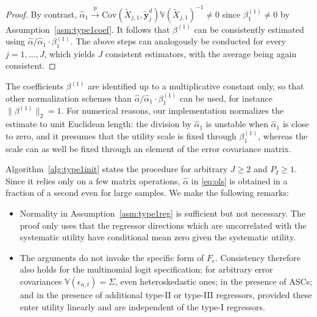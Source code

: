 \documentclass[preprint,12pt,authoryear]{elsarticle}
\newcommand{\pto}{\xrightarrow{p}}
\newcommand{\Var}{\mathbb{V}}
\newcommand{\Cov}{\text{Cov}}
\newcommand{\norm}[1]{\ensuremath{\lVert #1\rVert_2}}
\begin{document}
\begin{proof}
By contrast, $\hat{\alpha}_1 \pto \Cov(\tilde{X}_{j,1}, \tilde{\bm{y}}_j^d) \Var(\tilde{X}_{j,1})^{-1} \neq 0$ since $\beta^{(1)}_1 \neq 0$ by Assumption~\ref{asm:type1coef}. It follows that $\beta^{(1)}$ can be consistently estimated using $\hat \alpha / \hat{\alpha}_1 \cdot \beta^{(1)}_1$. The above steps can analogously be conducted for every $j = 1,\dots,J$, which yields $J$ consistent estimators, with the average being again consistent.
\end{proof}

The coefficients $\beta^{(1)}$ are identified up to a multiplicative constant only, so that other normalization schemes than $\hat{\alpha} / \hat{\alpha}_1 \cdot \beta^{(1)}_1$ can be used, for instance $\norm{\beta^{(1)}} = 1$. For numerical reasons, our implementation normalizes the estimate to unit Euclidean length: the division by $\hat{\alpha}_1$ is unstable when $\hat{\alpha}_1$ is close to zero, and it presumes that the utility scale is fixed through $\beta^{(1)}_1$, whereas the scale can as well be fixed through an element of the error covariance matrix.

Algorithm~\ref{alg:type1init} states the procedure for arbitrary $J \geq 2$ and $P_I \geq 1$. Since it relies only on a few matrix operations, $\hat{\alpha}$ in \eqref{eq:ols} is obtained in a fraction of a second even for large samples. We make the following remarks:
%
\begin{itemize}
    \item Normality in Assumption~\ref{asm:type1reg} is sufficient but not necessary. The proof only uses that the regressor directions which are uncorrelated with the systematic utility have conditional mean zero given the systematic utility.
    \item The arguments do not invoke the specific form of $F_\epsilon$. Consistency therefore also holds for the multinomial logit specification; for arbitrary error covariances $\Var(\epsilon_{n,t}) = \Sigma$, even heteroskedastic ones; in the presence of ASCs; and in the presence of additional type-II or type-III regressors, provided these enter utility linearly and are independent of the type-I regressors.
\end{itemize}
\end{document}
